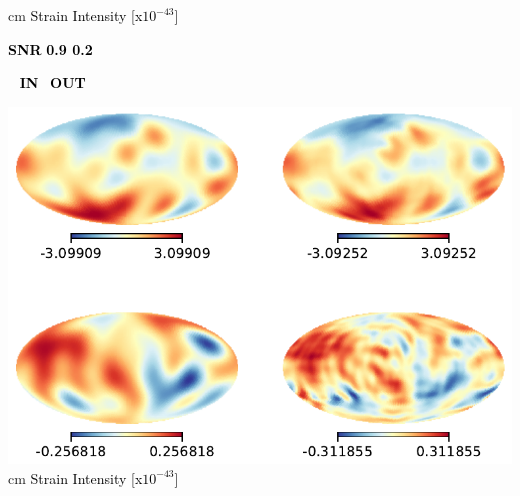 \documentclass[handout]{beamer}
\begin{document}
{\begin{frame}[plain]
\begin{minipage}{0.79\textwidth}
\centering
 		 cm
 		\footnotesize
 	\textcolor{black}{Strain Intensity [x$10^{{-{43}}}$]}

\end{minipage}

 \end{frame}

\begin{frame}[plain]
  \vskip 0.7cm
\begin{minipage}{0.061\textwidth}

\vskip -2.3cm
\textcolor{black}{\Large \bf SNR}
\centering
\large \textcolor{black}{\centering \bf  0.9
\vskip 2.7cm
\large \bf  0.2}\\
\vskip 2.5cm
\end{minipage}\qquad
\begin{minipage}{0.79\textwidth}
  \Large\qquad \,\,\,\quad\textcolor{black}{ \bf IN}\,\,\,\quad\qquad\qquad\qquad \textcolor{black}{ \bf OUT}
\medskip

\centering
 	  \includegraphics[width=\textwidth]{map/maps23.pdf} %
 		 cm
 		\footnotesize
 	\textcolor{black}{Strain Intensity [x$10^{{-{43}}}$]}


\end{minipage}
\end{frame}}
\end{document}
